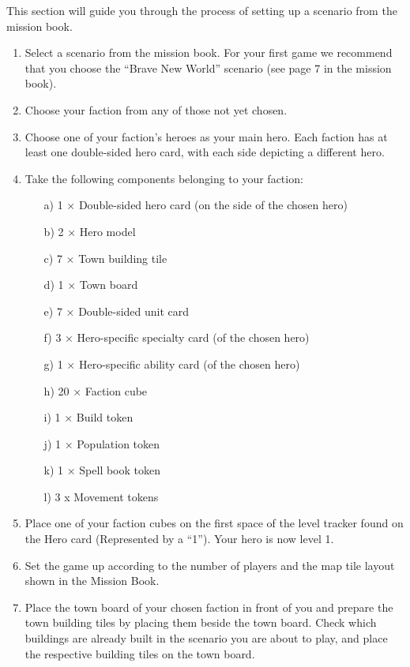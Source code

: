 This section will guide you through the process of setting up a scenario from the mission book.

\begin{enumerate}
  \item Select a scenario from the mission book.
    For your first game we recommend that you choose the “Brave New World” scenario (see page 7 in the mission book).
  \item Choose your faction from any of those not yet chosen.
  \item Choose one of your faction’s heroes as your main hero.
    Each faction has at least one double-sided hero card, with each side depicting a different hero.
  \item Take the following components belonging to your faction:
  \begin{itemize}
    \item[a)]1 × Double-sided hero card (on the side of the chosen hero)
    \item[b)]2 × Hero model
    \item[c)]7 × Town building tile
    \item[d)]1 × Town board
    \item[e)]7 × Double-sided unit card
    \item[f)]3 × Hero-specific specialty card (of the chosen hero)
    \item[g)]1 × Hero-specific ability card (of the chosen hero)
    \item[h)]20 × Faction cube
    \item[i)]1 × Build token
    \item[j)]1 × Population token
    \item[k)]1 × Spell book token
    \item[l)]3 x Movement tokens
  \end{itemize}
  \item Place one of your faction cubes on the first space of the level tracker found on the Hero card (Represented by a “1”).
    Your hero is now level 1.
  \item Set the game up according to the number of players and the map tile layout shown in the Mission Book.
  \item Place the town board of your chosen faction in front of you and prepare the town building tiles by placing them beside the town board.
    Check which buildings are already built in the scenario you are about to play, and place the respective building tiles on the town board.

\end{enumerate}
